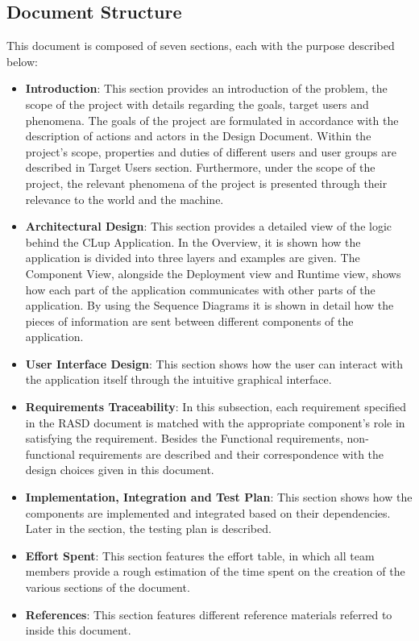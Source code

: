 \subsection{Document Structure}
This document is composed of seven sections, each with the purpose described below: \\
\begin{itemize}
    \item \textbf{Introduction}: This section provides an introduction of the problem, the scope of the project with details regarding the goals, target users and phenomena.
    The goals of the project are formulated in accordance with the description of actions and actors in the Design Document.
    Within the project's scope, properties and duties of different users and user groups are described in Target Users section.
    Furthermore, under the scope of the project, the relevant phenomena of the project is presented through their relevance to the world and the machine.
    \item \textbf{Architectural Design}: This section provides a detailed view of the logic behind the CLup Application.
    In the Overview, it is shown how the application is divided into three layers and examples are given.
    The Component View, alongside the Deployment view and Runtime view, shows how each part of the application communicates with other parts of the application.
    By using the Sequence Diagrams it is shown in detail how the pieces of information are sent between different components of the application.
    \item \textbf{User Interface Design}: This section shows how the user can interact with the application itself through the intuitive graphical interface.
    \item \textbf{Requirements Traceability}: In this subsection, each requirement specified in the RASD document is matched with the appropriate component’s role in satisfying the requirement.
    Besides the Functional requirements, non-functional requirements are described and their correspondence with the design choices given in this document.
    \item \textbf{Implementation, Integration and Test Plan}: This section shows how the components are implemented and integrated based on their dependencies.
    Later in the section, the testing plan is described.
    \item \textbf{Effort Spent}: This section features the effort table, in which all team members provide a rough estimation of the time spent on the creation of the various sections of the document.
    \item \textbf{References}: This section features different reference materials referred to inside this document.
\end{itemize}
